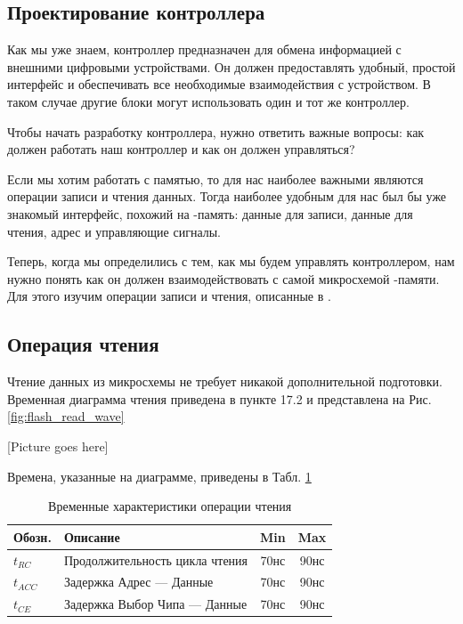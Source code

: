 \subsection{Проектирование контроллера }
\par{Как мы уже знаем, контроллер предназначен для обмена информацией с внешними цифровыми устройствами. Он должен предоставлять удобный, простой интерфейс и обеспечивать все необходимые взаимодействия с устройством. В таком случае другие блоки могут использовать один и тот же контроллер.} 
\par{Чтобы начать разработку контроллера, нужно ответить важные вопросы: как должен работать наш контроллер и как он должен управляться?}
\par{Если мы хотим работать с памятью, то для нас наиболее важными являются операции записи и чтения данных.  Тогда наиболее удобным для нас был бы уже знакомый интерфейс, похожий на -память: данные для записи, данные для чтения, адрес и управляющие сигналы.}
\par{Теперь, когда мы определились с тем, как мы будем управлять контроллером, нам нужно понять как он должен взаимодействовать с самой микросхемой -памяти. Для этого изучим операции записи и чтения, описанные в .}

\subsection{Операция чтения}
\par{Чтение данных из микросхемы  не требует никакой дополнительной подготовки. Временная диаграмма чтения приведена в пункте 17.2  и представлена на Рис.\ref{fig:flash_read_wave}}

\par{[Picture goes here]}
% 

\par{Времена, указанные на диаграмме, приведены в Табл. \ref{table:flash_read_timings}}

\begin{table}[htbp]
  \centering
  \small
  \begin{tabular}{l|l|c|c}
    Обозн. & Описание & Min & Max \\
    \hline
    $t_{RC}$ & Продолжительность цикла чтения & 70нс & 90нс\\
    $t_{ACC}$ & Задержка Адрес --- Данные & 70нс & 90нс\\
    $t_{CE}$ & Задержка Выбор Чипа --- Данные & 70нс & 90нс\\
  \end{tabular}
  \caption{Временные характеристики операции чтения }
  \label{table:flash_read_timings}
\end{table}

